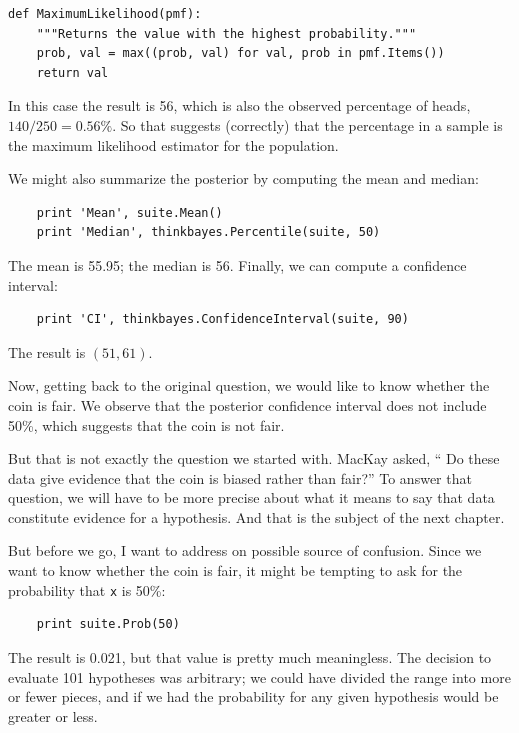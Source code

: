 \documentclass[12pt]{book}
\begin{document}
\begin{verbatim}
def MaximumLikelihood(pmf):
    """Returns the value with the highest probability."""
    prob, val = max((prob, val) for val, prob in pmf.Items())
    return val
\end{verbatim}

In this case the result is 56, which is also the observed percentage of
heads, $140/250 = 0.56\%$.  So that suggests (correctly) that the
percentage in a sample is the maximum likelihood estimator
for the population.

We might also summarize the posterior by computing the mean
and median:

\begin{verbatim}
    print 'Mean', suite.Mean()
    print 'Median', thinkbayes.Percentile(suite, 50)
\end{verbatim}

The mean is 55.95; the median is 56.  Finally, we can compute a
confidence interval: 

\begin{verbatim}
    print 'CI', thinkbayes.ConfidenceInterval(suite, 90)
\end{verbatim}

The result is $(51, 61)$.

Now, getting back to the original question,
we would like to know whether the coin is fair.  We observe
that the posterior confidence interval does not include 50\%,
which suggests that the coin is not fair.

But that is not exactly the question we started with.  MacKay asked,
`` Do these data give evidence that the coin is biased rather than
fair?''  To answer that question, we will have to be more precise
about what it means to say that data constitute evidence for
a hypothesis.  And that is the subject of the next chapter.

But before we go, I want to address on possible source of confusion.
Since we want to know whether the coin is fair, it might be tempting
to ask for the probability that {\tt x} is 50\%:

\begin{verbatim}
    print suite.Prob(50)
\end{verbatim}

The result is 0.021, but that value is pretty much meaningless.  The
decision to evaluate 101 hypotheses was arbitrary; we could have
divided the range into more or fewer pieces, and if we had the
probability for any given hypothesis would be greater or less.
\end{document}
